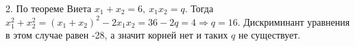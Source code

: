 2. По теореме Виета $x_1+x_2=6,\ x_1x_2=q.$ Тогда $x_1^2+x_2^2=(x_1+x_2)^2-2x_1x_2=36-2q=4\Rightarrow q=16.$ Дискриминант уравнения в этом случае равен -28, а значит корней нет и таких $q$ не существует.\\
